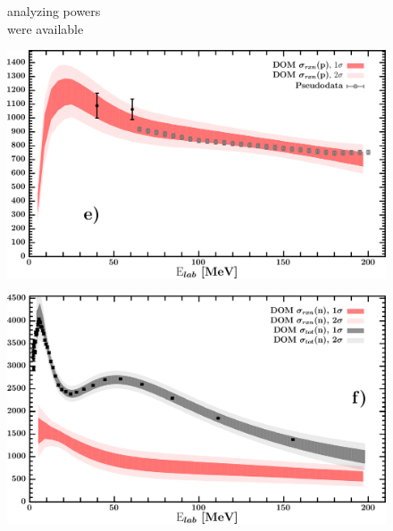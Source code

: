 \documentclass[twocolumn,secnumarabic,amssymb, nobibnotes, aps, prl,
superscriptaddress, nobalancelastpage, draft]{revtex4}
\begin{document}
\begin{figure}[!htb]
\begin{minipage}{0.4\linewidth}
\begin{minipage}[c]{0.45\linewidth}
            analyzing powers \\
            were available
        \end{minipage}
        \label{DOM_ni64_neutron_elastic}
    \end{minipage}
    \centering
    \begin{minipage}{0.4\linewidth}
        \centering
        \includegraphics[width=\linewidth]{figures/ni64_protonInelastic.png}
        \label{DOM_ni64_proton_inelastic}
    \end{minipage}\hspace{6pt}
    \begin{minipage}{0.4\linewidth}
        \centering
        \includegraphics[width=\linewidth]{figures/ni64_neutronInelastic.png}
        \label{DOM_ni64_neutron_inelastic}
    \end{minipage}
    \centering
    \begin{minipage}{0.4\linewidth}
        \centering

\end{minipage}
\end{figure}
\end{document}
